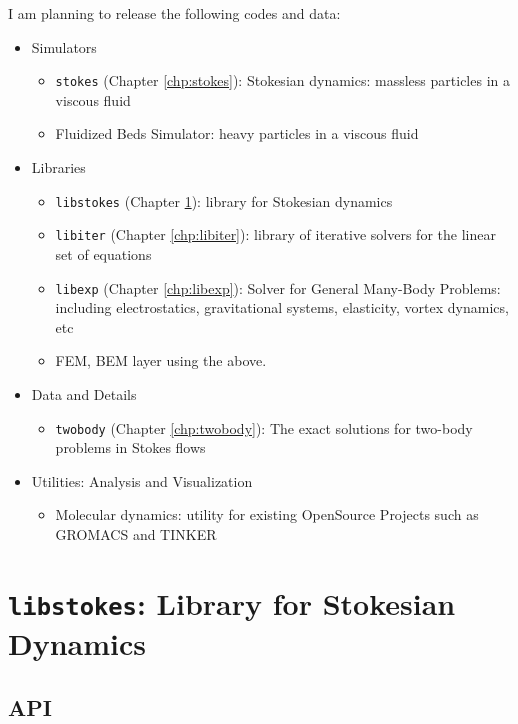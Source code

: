 \documentclass{book}
\begin{document}
I am planning to release the following codes and data:
\begin{itemize}
\item Simulators
  \begin{itemize}
  \item {\tt stokes} (Chapter \ref{chp:stokes}):
    Stokesian dynamics: massless particles in a viscous fluid
  \item 
    Fluidized Beds Simulator: heavy particles in a viscous fluid
    \cite{ichiki1995,ichiki1998}
  \end{itemize}
\item Libraries
  \begin{itemize}
  \item {\tt libstokes} (Chapter \ref{chp:libstokes}):
    library for Stokesian dynamics
    \cite{brady1988a,durlofsky1987a,brady1988b,ichiki2002}
  \item {\tt libiter} (Chapter \ref{chp:libiter}):
    library of iterative solvers for the linear set of equations
    \cite{ichiki2001}
  \item {\tt libexp} (Chapter \ref{chp:libexp}):
    Solver for General Many-Body Problems:
    including electrostatics, gravitational systems,
    elasticity, vortex dynamics, etc
  \item FEM, BEM layer using the above.
  \end{itemize}
\item Data and Details
  \begin{itemize}
  \item {\tt twobody} (Chapter \ref{chp:twobody}):
    The exact solutions for two-body problems in Stokes flows
    \cite{JeffreyOnishi1984,jeffrey1992,jeffrey1993}
  \end{itemize}
\item Utilities: Analysis and Visualization
  \begin{itemize}
  \item Molecular dynamics:
    utility for existing OpenSource Projects such as GROMACS and TINKER
    \cite{IchikiConsta2006}
  \end{itemize}
\end{itemize}




\chapter{{\tt libstokes}:
  Library for Stokesian Dynamics}
\label{chp:libstokes}
\section{API}
\end{document}
